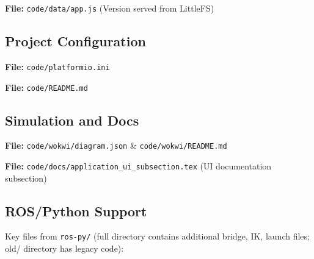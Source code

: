 

\textbf{File:} \texttt{code/data/app.js} (Version served from LittleFS)



\subsection*{Project Configuration}
\textbf{File:} \texttt{code/platformio.ini}



\textbf{File:} \texttt{code/README.md}



\subsection*{Simulation and Docs}
\textbf{File:} \texttt{code/wokwi/diagram.json} \& \texttt{code/wokwi/README.md}





\textbf{File:} \texttt{code/docs/application_ui_subsection.tex} (UI documentation subsection)



\subsection*{ROS/Python Support}
Key files from \texttt{ros-py/} (full directory contains additional bridge, IK, launch files; old/ directory has legacy code):





